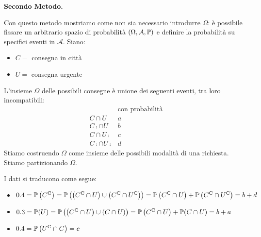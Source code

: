\textbf{Secondo Metodo.}

Con questo metodo mostriamo come non sia necessario introdurre $\Omega $: è possibile fissare un arbitrario spazio di probabilità $( \Omega ,\mathcal{A} ,\mathbb{P})$ e definire la probabilità su specifici eventi in $\mathcal{A}$. Siano:
\begin{itemize}
	\item $C=$ consegna in città
	\item $U=$ consegna urgente
\end{itemize}

L'insieme $\Omega $ delle possibili consegne è unione dei seguenti eventi, tra loro incompatibili:
\[
	\begin{array}{lc}
			& \text{con probabilità}\\
		C\cap U & a\\
		C\comp \cap U & b\\
		C\cap U\comp & c\\
		C\comp \cap U\comp & d
	\end{array}
\]
Stiamo costruendo $\Omega $ come insieme delle possibili modalità di una richiesta. Stiamo partizionando $\Omega $.



I dati si traducono come segue:
\begin{itemize}
	\item $0.4=\mathbb{P}\left( C^{\mathrm{C}}\right) =\mathbb{P}\left(\left( C^{\mathrm{C}} \cap U\right) \cup \left( C^{\mathrm{C}} \cap U^{\mathrm{C}}\right)\right)=\mathbb{P}\left( C^{\mathrm{C}} \cap U\right) +\mathbb{P}\left( C^{\mathrm{C}} \cap U^{\mathrm{C}}\right)=b+d$
	\item $0.3=\mathbb{P}( U) =\mathbb{P}\left(\left( C^{\mathrm{C}} \cap U\right) \cup ( C\cap U)\right)=\mathbb{P}\left( C^{\mathrm{C}} \cap U\right) +\mathbb{P}( C\cap U)=b+a$
	\item $0.4=\mathbb{P}\left( U^{\mathrm{C}} \cap C\right) =c$
\end{itemize}

